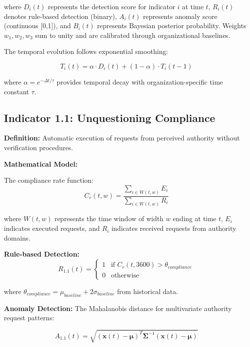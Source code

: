 \documentclass[11pt,a4paper]{article}
\begin{document}
where $D_i(t)$ represents the detection score for indicator $i$ at time $t$, $R_i(t)$ denotes rule-based detection (binary), $A_i(t)$ represents anomaly score (continuous [0,1]), and $B_i(t)$ represents Bayesian posterior probability. Weights $w_1, w_2, w_3$ sum to unity and are calibrated through organizational baselines.

The temporal evolution follows exponential smoothing:

\begin{equation}
T_i(t) = \alpha \cdot D_i(t) + (1-\alpha) \cdot T_i(t-1)
\end{equation}

where $\alpha = e^{-\Delta t/\tau}$ provides temporal decay with organization-specific time constant $\tau$.

\subsection{Indicator 1.1: Unquestioning Compliance}

\textbf{Definition:} Automatic execution of requests from perceived authority without verification procedures.

\textbf{Mathematical Model:}

The compliance rate function:
\begin{equation}
C_r(t,w) = \frac{\sum_{i \in W(t,w)} E_i}{\sum_{i \in W(t,w)} R_i}
\end{equation}

where $W(t,w)$ represents the time window of width $w$ ending at time $t$, $E_i$ indicates executed requests, and $R_i$ indicates received requests from authority domains.

\textbf{Rule-based Detection:}
\begin{equation}
R_{1.1}(t) = \begin{cases}
1 & \text{if } C_r(t,3600) > \theta_{compliance} \\
0 & \text{otherwise}
\end{cases}
\end{equation}

where $\theta_{compliance} = \mu_{baseline} + 2\sigma_{baseline}$ from historical data.

\textbf{Anomaly Detection:}
The Mahalanobis distance for multivariate authority request patterns:

\begin{equation}
A_{1.1}(t) = \sqrt{(\mathbf{x}(t) - \boldsymbol{\mu})^T \boldsymbol{\Sigma}^{-1} (\mathbf{x}(t) - \boldsymbol{\mu})}
\end{equation}
\end{document}
